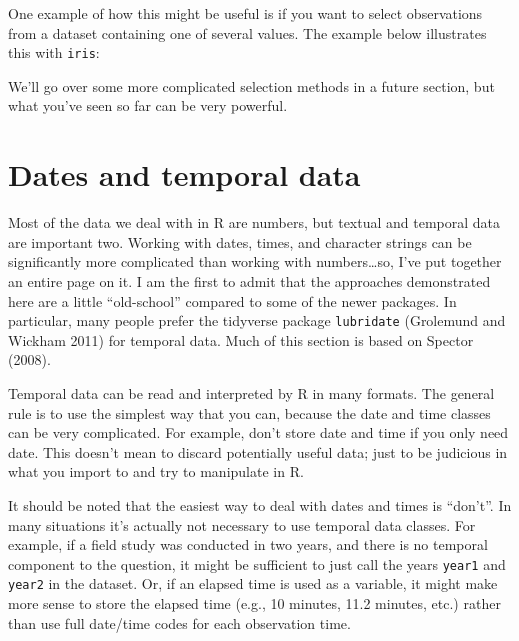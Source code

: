 \documentclass[
  13,
  letterpaper,
]{report}
\newenvironment{Shaded}{\begin{snugshade}}{\end{snugshade}}
\newcommand{\CommentTok}[1]{\textcolor[rgb]{0.37,0.37,0.37}{#1}}
\newcommand{\FunctionTok}[1]{\textcolor[rgb]{0.28,0.35,0.67}{#1}}
\newcommand{\NormalTok}[1]{\textcolor[rgb]{0.00,0.23,0.31}{#1}}
\newcommand{\SpecialCharTok}[1]{\textcolor[rgb]{0.37,0.37,0.37}{#1}}
\newcommand{\StringTok}[1]{\textcolor[rgb]{0.13,0.47,0.30}{#1}}
\begin{document}
One example of how this might be useful is if you want to select
observations from a dataset containing one of several values. The
example below illustrates this with \texttt{iris}:

\begin{Shaded}
\end{Shaded}

We'll go over some more complicated selection methods in a future
section, but what you've seen so far can be very powerful.

\section{Dates and temporal data}\label{sec-manip-date}

Most of the data we deal with in R are numbers, but textual and temporal
data are important two. Working with dates, times, and character strings
can be significantly more complicated than working with
numbers\ldots so, I've put together an entire page on it. I am the first
to admit that the approaches demonstrated here are a little
``old-school'' compared to some of the newer packages. In particular,
many people prefer the tidyverse package \texttt{lubridate} (Grolemund
and Wickham 2011) for temporal data. Much of this section is based on
Spector (2008).

Temporal data can be read and interpreted by R in many formats. The
general rule is to use the simplest way that you can, because the date
and time classes can be very complicated. For example, don't store date
and time if you only need date. This doesn't mean to discard potentially
useful data; just to be judicious in what you import to and try to
manipulate in R.

It should be noted that the easiest way to deal with dates and times is
``don't''. In many situations it's actually not necessary to use
temporal data classes. For example, if a field study was conducted in
two years, and there is no temporal component to the question, it might
be sufficient to just call the years \texttt{year1} and \texttt{year2}
in the dataset. Or, if an elapsed time is used as a variable, it might
make more sense to store the elapsed time (e.g., 10 minutes, 11.2
minutes, etc.) rather than use full date/time codes for each observation
time.
\end{document}

